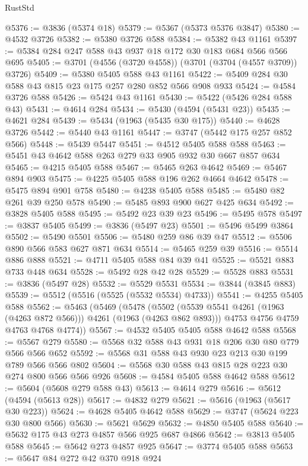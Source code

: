 \begin{lexlean}{RustStd}
\begin{coremodule}
@5376 := @3836 (@5374 @18)
@5379 := @5367 (@5373 @5376 @3847)
@5380 := @4532 @3726
@5382 := @5380 @3726 @588
@5384 := @5382 @43 @1161
@5397 := @5384 @284 @247 @588 @43 @937 @18 @172 @30 @183 @684 @566 @566 @695
@5405 := @3701 (@4556 (@3720 @4558)) (@3701 (@3704 (@4557 @3709)) @3726)
@5409 := @5380 @5405 @588 @43 @1161
@5422 := @5409 @284 @30 @588 @43 @815 @23 @175 @257 @280 @852 @566 @908 @933
@5424 := @4584 @3726 @588
@5426 := @5424 @43 @1161
@5430 := @5422 (@5426 @284 @588 @43)
@5431 := @4614 @284
@5434 := @5430 (@4594 (@5431 @23))
@5435 := @4621 @284
@5439 := @5434 (@1963 (@5435 @30 @175))
@5440 := @4628 @3726
@5442 := @5440 @43 @1161
@5447 := @3747 (@5442 @175 @257 @852 @566)
@5448 := @5439 @5447
@5451 := @4512 @5405 @588 @588
@5463 := @5451 @43 @4642 @588 @263 @279 @33 @905 @932 @30 @667 @857 @634
@5465 := @4215 @5405 @588
@5467 := @5465 @263 @4642
@5469 := @5467 @894 @903
@5475 := @4225 @5405 @588 @196 @262 @4664 @4642
@5478 := @5475 @894 @901 @758
@5480 := @4238 @5405 @588
@5485 := @5480 @82 @261 @39 @250 @578
@5490 := @5485 @893 @900 @627 @425 @634
@5492 := @3828 @5405 @588
@5495 := @5492 @23 @39 @23
@5496 := @5495 @578
@5497 := @3837 @5405
@5499 := @3836 (@5497 @23)
@5501 := @5496 @5499 @3864
@5502 := @5490 @5501
@5506 := @5480 @259 @86 @39 @47
@5512 := @5506 @890 @566 @583 @627 @871 @634
@5514 := @5465 @259 @39
@5516 := @5514 @886 @888
@5521 := @4711 @5405 @588 @84 @39 @41
@5525 := @5521 @883 @733 @448 @634
@5528 := @5492 @28 @42 @28
@5529 := @5528 @883
@5531 := @3836 (@5497 @28)
@5532 := @5529 @5531
@5534 := @3844 (@3845 @883)
@5539 := @5512 (@5516 (@5525 (@5532 @5534) @4733))
@5541 := @4255 @5405 @588
@5562 := @5463
    (@5469
      (@5478
        (@5502 (@5539 @5541 @4261 (@1963 (@4263 @872 @566))) @4261 (@1963 (@4263 @862 @893)))
        @4753
        @4756
        @4759
        @4763
        @4768
        @4774))
@5567 := @4532 @5405 @5405 @588 @4642 @588
@5568 := @5567 @279
@5580 := @5568 @32 @588 @43 @931 @18 @206 @30 @80 @779 @566 @566 @652
@5592 := @5568 @31 @588 @43 @930 @23 @213 @30 @199 @789 @566 @566 @802
@5604 := @5568 @30 @588 @43 @815 @28 @223 @30 @274 @800 @566 @566 @926
@5608 := @4584 @5405 @588 @4642 @588
@5612 := @5604 (@5608 @279 @588 @43)
@5613 := @4614 @279
@5616 := @5612 (@4594 (@5613 @28))
@5617 := @4832 @279
@5621 := @5616 (@1963 (@5617 @30 @223))
@5624 := @4628 @5405 @4642 @588
@5629 := @3747 (@5624 @223 @30 @800 @566)
@5630 := @5621 @5629
@5632 := @4850 @5405 @588
@5640 := @5632 @175 @43 @273 @4857 @566 @925 @687 @4866
@5642 := @3813 @5405 @588
@5645 := @5642 @273 @4857 @925
@5647 := @3774 @5405 @588
@5653 := @5647 @84 @272 @42 @370 @918 @924

\end{coremodule}
\end{lexlean}
